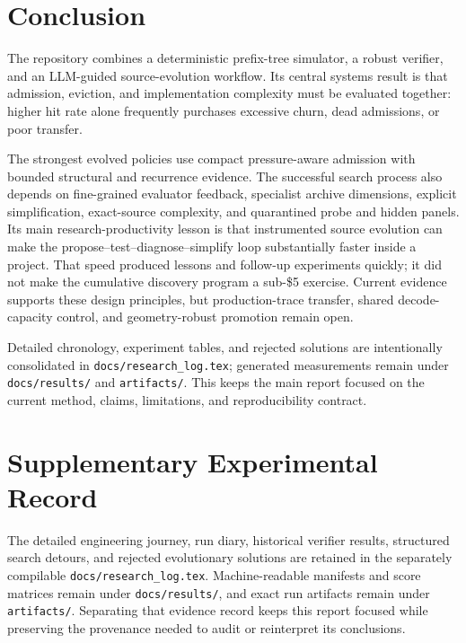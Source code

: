 \documentclass[11pt]{article}
\newcommand{\filepath}[1]{\nolinkurl{#1}}
\begin{document}
\section{Conclusion}

The repository combines a deterministic prefix-tree simulator, a robust verifier, and
an LLM-guided source-evolution workflow.  Its central systems result is that admission,
eviction, and implementation complexity must be evaluated together: higher hit rate
alone frequently purchases excessive churn, dead admissions, or poor transfer.

The strongest evolved policies use compact pressure-aware admission with bounded
structural and recurrence evidence.  The successful search process also depends on
fine-grained evaluator feedback, specialist archive dimensions, explicit
simplification, exact-source complexity, and quarantined probe and hidden panels.
Its main research-productivity lesson is that instrumented source evolution can make
the propose--test--diagnose--simplify loop substantially faster inside a project.
That speed produced lessons and follow-up experiments quickly; it did not make the
cumulative discovery program a sub-\$5 exercise.
Current evidence supports these design principles, but production-trace transfer,
shared decode-capacity control, and geometry-robust promotion remain open.

Detailed chronology, experiment tables, and rejected solutions are intentionally
consolidated in \filepath{docs/research_log.tex}; generated measurements remain under
\filepath{docs/results/} and \filepath{artifacts/}.  This keeps the main report focused
on the current method, claims, limitations, and reproducibility contract.

\appendix

\section{Supplementary Experimental Record}

The detailed engineering journey, run diary, historical verifier results, structured
search detours, and rejected evolutionary solutions are retained in the separately
compilable \filepath{docs/research_log.tex}.  Machine-readable manifests and score
matrices remain under \filepath{docs/results/}, and exact run artifacts remain under
\filepath{artifacts/}.
Separating that evidence record keeps this report focused while preserving the
provenance needed to audit or reinterpret its conclusions.
\end{document}
